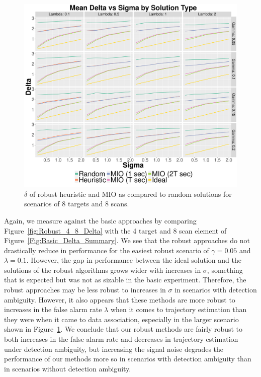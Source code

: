 \begin{figure}[ht]
  \centering
  \includegraphics[width=\columnwidth]{../Figures/8_8_Delta}
  \caption{$\delta$ of robust heuristic and MIO as compared to random solutions for scenarios of 8 targets and 8 scans.}
  \label{fig:Robust_8_8_Delta}
\end{figure}

Again, we measure against the basic approaches by comparing Figure~\ref{fig:Robust_4_8_Delta} with the 4 target and 8 scan element of Figure~\ref{Fig:Basic_Delta_Summary}. We see that the robust approaches do not drastically reduce in performance for the easiest robust scenario of $\gamma = 0.05$ and $\lambda = 0.1$. However, the gap in performance between the ideal solution and the solutions of the robust algorithms grows wider with increases in $\sigma$, something that is expected but was not as sizable in the basic experiment. Therefore, the robust approaches may be less robust to increases in $\sigma$ in scenarios with detection ambiguity. However, it also appears that these methods are more robust to increases in the false alarm rate $\lambda$ when it comes to trajectory estimation than they were when it came to data association, especially in the larger scenario shown in Figure~\ref{fig:Robust_8_8_Delta}. We conclude that our robust methods are fairly robust to both increases in the false alarm rate and decreases in trajectory estimation under detection ambiguity, but increasing the signal noise degrades the performance of our methods more so in scenarios with detection ambiguity than in scenarios without detection ambiguity.

